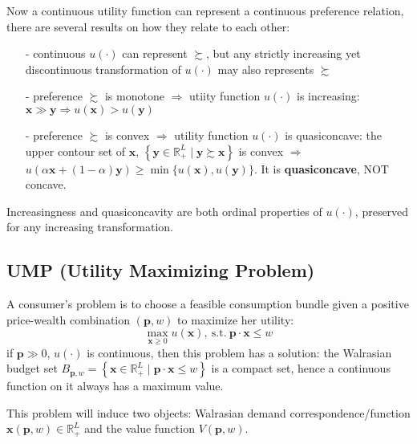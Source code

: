 Now a continuous utility function can represent a continuous preference relation, there are several results on how they relate to each other:
\begin{enumerate}
    \item[-] continuous $u(\cdot)$ can represent $\succsim$, but any strictly increasing yet discontinuous transformation of $u(\cdot)$ may also represents $\succsim$
    \item[-] preference $\succsim$ is monotone $\Rightarrow$ utiity function $u(\cdot)$ is increasing: $\mathbf{x}\gg \mathbf{y}\Rightarrow u(\mathbf{x})>u(\mathbf{y})$ 
    \item[-] preference $\succsim$ is convex $\Rightarrow$ utility function $u(\cdot)$ is quasiconcave: the upper contour set of $\mathbf{x}$, 
    $\left\{\mathbf{y}\in\mathbb{R}^L_+\mid \mathbf{y}\succsim \mathbf{x} \right\}$ is convex $\Rightarrow$ $u(\alpha\mathbf{x}+(1-\alpha)\mathbf{y})\geq \min\{u(\mathbf{x}),u(\mathbf{y})\}$. 
    It is \textbf{quasiconcave}, NOT concave.
\end{enumerate}
Increasingness and quasiconcavity are both ordinal properties of $u(\cdot)$, preserved for any increasing transformation.

\subsection{UMP (Utility Maximizing Problem)}
A consumer's problem is to choose a feasible consumption bundle given a positive price-wealth combination $(\mathbf{p},w)$ to maximize her utility:
$$\max_{\mathbf{x}\geq 0} u(\mathbf{x}),\ \text{s.t.}\ \mathbf{p}\cdot\mathbf{x}\leq w$$
if $\mathbf{p}\gg 0$, $u(\cdot)$ is continuous, then this problem has a solution: the Walrasian budget set $B_{\mathbf{p},w}=\left\{\mathbf{x}\in\mathbb{R}^L_+\mid \mathbf{p}\cdot\mathbf{x}\leq w\right\}$ is a compact set, hence a continuous function on it always has a maximum value.

This problem will induce two objects: Walrasian demand correspondence/function $\mathbf{x}(\mathbf{p},w)\in \mathbb{R}^L_+$ and the value function $V(\mathbf{p},w)$.

